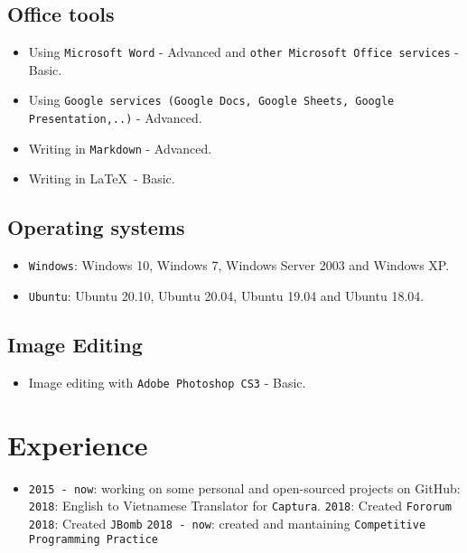 \documentclass{article}
\begin{document}
        \subsection{Office tools}
        \begin{itemize}
            \item Using \texttt{Microsoft Word} - Advanced and \texttt{other Microsoft Office services} - Basic.
            \item Using \texttt{Google services (Google Docs, Google Sheets, Google Presentation,..)} - Advanced.
            \item Writing in \texttt{Markdown} - Advanced.
            \item Writing in \LaTeX\ - Basic.
        \end{itemize}

        \subsection{Operating systems}
        \begin{itemize}
            \item \texttt{Windows}: Windows 10, Windows 7, Windows Server 2003 and Windows XP.
            \item \texttt{Ubuntu}: Ubuntu 20.10, Ubuntu 20.04, Ubuntu 19.04 and Ubuntu 18.04.
        \end{itemize}

        \subsection{Image Editing}
        \begin{itemize}
            \item Image editing with \texttt{Adobe Photoshop CS3} - Basic.
        \end{itemize}

    \section{Experience}
            \begin{itemize}
                \item \texttt{2015 - now}: working on some personal and open-sourced projects on GitHub:
                \subitem \texttt{2018}: English to Vietnamese Translator for \texttt{Captura}\cite{Captura}.
                \subitem \texttt{2018}: Created \texttt{Fororum}\cite{fororum}
                \subitem \texttt{2018}: Created \texttt{JBomb}\cite{jbomb}
                \subitem \texttt{2018 - now}: created and mantaining \texttt{Competitive Programming Practice}\cite{cpp}
            \end{itemize}
\end{document}
